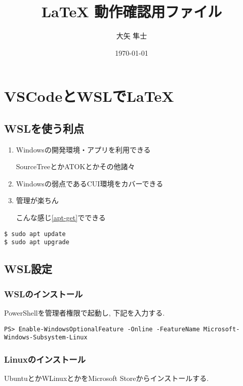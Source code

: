\documentclass[a4j,12pt]{jreport}
\title{ {\LaTeX} 動作確認用ファイル}
\author{大矢 隼士}
\date{\today}
\begin{document}
    \maketitle
    \tableofcontents

    \chapter{VSCodeとWSLで\LaTeX }
        \section{WSLを使う利点}
            \begin{enumerate}
                \item Windowsの開発環境・アプリを利用できる
                
                SourceTreeとかATOKとかその他諸々

                \item Windowsの弱点であるCUI環境をカバーできる
                
                \item 管理が楽ちん
                
                こんな感じ\ref{apt-get}でできる\cite{sourceCode}\cite{sourceCode2}

            \end{enumerate}
            \begin{lstlisting}[caption=コマンド,label=apt-get]
$ sudo apt update
$ sudo apt upgrade
            \end{lstlisting}

        \section{WSL設定}
            \subsection{WSLのインストール}
                PowerShellを管理者権限で起動し, 下記を入力する. 
                \begin{lstlisting}[caption=PowerShell,label=ps]
PS> Enable-WindowsOptionalFeature -Online -FeatureName Microsoft-Windows-Subsystem-Linux
                \end{lstlisting}

            \subsection{Linuxのインストール}
                UbuntuとかWLinuxとかをMicrosoft Storeからインストールする.
            
\end{document}
